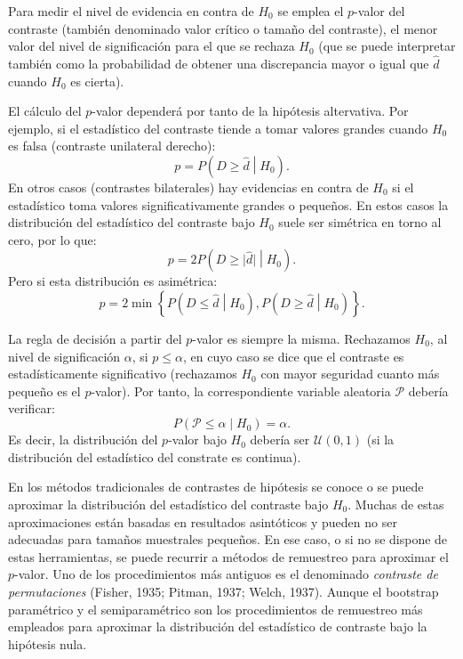 \documentclass[
  10pt,
]{book}
\theoremstyle{break}
\theoremstyle{nonumberplain}
\begin{document}
Para medir el nivel de evidencia en contra de \(H_0\) se emplea el
\(p\)-valor del contraste (también denominado valor crítico o
tamaño del contraste), el menor valor del nivel
de significación para el que se rechaza \(H_0\)
(que se puede interpretar también como la
probabilidad de obtener una discrepancia mayor o igual que
\(\hat{d}\) cuando \(H_0\) es cierta).

El cálculo del \(p\)-valor dependerá por tanto de la hipótesis altervativa.
Por ejemplo, si el estadístico del contraste tiende a tomar valores
grandes cuando \(H_0\) es falsa (contraste unilateral derecho):
\[p = P\left( D \geq \hat{d} \middle| H_0\right).\]
En otros casos (contrastes bilaterales) hay evidencias en contra de
\(H_0\) si el estadístico toma valores significativamente grandes o pequeños.
En estos casos la distribución del estadístico del contraste bajo \(H_0\)
suele ser simétrica en torno al cero, por lo que:
\[p = 2P\left( D \geq \vert \hat{d} \vert \middle| H_0 \right).\]
Pero si esta distribución es asimétrica:
\[p = 2 \min \left\{ P\left( D \leq \hat{d} \middle| H_0 \right),
P\left( D \geq \hat{d} \middle| H_0\right) \right\}.\]

La regla de decisión a partir del \(p\)-valor es siempre la misma.
Rechazamos \(H_0\), al nivel de significación \(\alpha\), si \(p \leq \alpha\),
en cuyo caso se dice que el contraste es estadísticamente significativo
(rechazamos \(H_0\) con mayor seguridad cuanto más pequeño es el \(p\)-valor).
Por tanto, la correspondiente variable aleatoria \(\mathcal{P}\) debería verificar:
\[P\left( \mathcal{P} \leq \alpha \middle| H_0\right)= \alpha.\]
Es decir, la distribución del \(p\)-valor bajo \(H_0\) debería ser \(\mathcal{U}(0,1)\)
(si la distribución del estadístico del constrate es continua).

En los métodos tradicionales de contrastes de hipótesis se conoce o se
puede aproximar la distribución del estadístico del contraste bajo \(H_0\).
Muchas de estas aproximaciones están basadas en resultados asintóticos
y pueden no ser adecuadas para tamaños muestrales pequeños.
En ese caso, o si no se dispone de estas herramientas,
se puede recurrir a métodos de remuestreo para aproximar el \(p\)-valor.
Uno de los procedimientos más antiguos es el denominado
\emph{contraste de permutaciones} (Fisher, 1935; Pitman, 1937; Welch, 1937).
Aunque el bootstrap paramétrico y el semiparamétrico son los
procedimientos de remuestreo más empleados para aproximar
la distribución del estadístico de contraste bajo la hipótesis nula.
\end{document}
